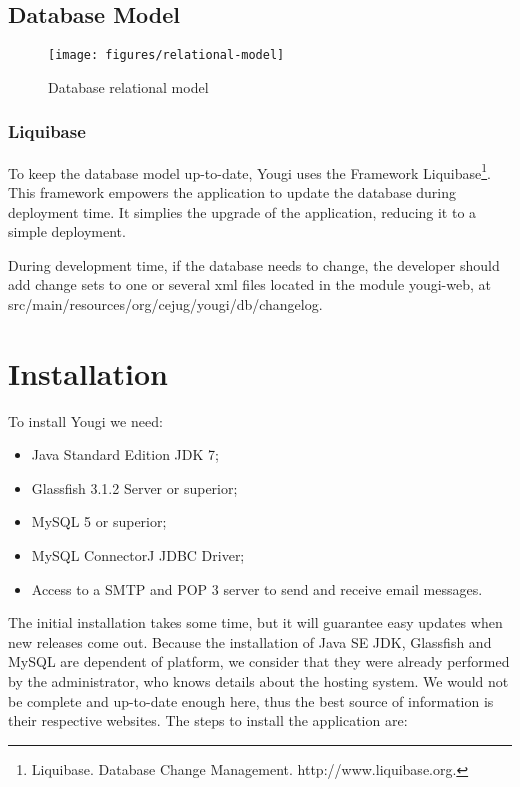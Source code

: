\documentclass[envcountsame,envcountchap,letterpaper]{svmono}
\begin{document}
\section{Database Model}

\begin{figure}
\centering
\texttt{[image: figures/relational-model]}
\caption{Database relational model}
\label{fig:relational-model}
\end{figure}

\subsection{Liquibase}

To keep the database model up-to-date, Yougi uses the Framework Liquibase\footnote{Liquibase. Database Change Management.  http://www.liquibase.org.}. This framework empowers the application to update the database during deployment time. It simplies the upgrade of the application, reducing it to a simple deployment.

During development time, if the database needs to change, the developer should add change sets to one or several xml files located in the module yougi-web, at src/main/resources/org/cejug/yougi/db/changelog.

\chapter{Installation}
\label{chp:installation}

To install Yougi we need:

\begin{itemize}
\item Java Standard Edition JDK 7;
\item Glassfish 3.1.2 Server or superior;
\item MySQL 5 or superior;
\item MySQL ConnectorJ JDBC Driver;
\item Access to a SMTP and POP 3 server to send and receive email messages.
\end{itemize}

The initial installation takes some time, but it will guarantee easy updates when new releases come out. Because the installation of Java SE JDK, Glassfish and MySQL are dependent of platform, we consider that they were already performed by the administrator, who knows details about the hosting system. We would not be complete and up-to-date enough here, thus the best source of information is their respective websites. The steps to install the application are:
\end{document}
